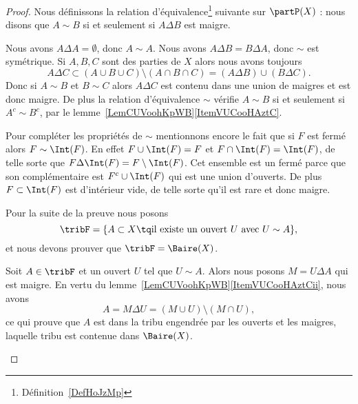 \begin{proof}
	Nous définissons la relation d'équivalence\footnote{Définition~\ref{DefHoJzMp}} suivante sur \( \partP(X)\) : nous disons que \( A\sim B\) si et seulement si \( A\Delta B\) est maigre.
	\begin{subproof}
		\spitem[Réflexive]
		Nous avons \( A\Delta A=\emptyset\), donc \( A\sim A\).
		\spitem[symétrique] Nous avons \( A\Delta B=B\Delta A\), donc \( \sim\) est symétrique.
		\spitem[transitive] Si \( A,B,C\) sont des parties de \( X\) alors nous avons toujours
		\begin{equation}
			A\Delta C\subset (A\cup B\cup C)\setminus(A\cap B\cap C)=(A\Delta B)\cup (B\Delta C).
		\end{equation}
		Donc si \( A\sim B\) et \( B\sim C\) alors \( A\Delta C\) est contenu dans une union de maigres et est donc maigre.
		De plus la relation d'équivalence \( \sim\) vérifie \( A\sim B\) si et seulement si \( A^c\sim B^c\), par le lemme~\ref{LemCUVoohKpWB}\ref{ItemVUCooHAztC}.

		Pour compléter les propriétés de \( \sim\) mentionnons encore le fait que si \( F\) est fermé alors \( F\sim\Int(F)\). En effet \( F\cup\Int(F)=F\) et \( F\cap\Int(F)=\Int(F)\), de telle sorte que \( F\Delta\Int(F)=F\setminus\Int(F)\). Cet ensemble est un fermé parce que son complémentaire est \( F^c\cup\Int(F)\) qui est une union d'ouverts. De plus \( F\subset\Int(F)\) est d'intérieur vide, de telle sorte qu'il est rare et donc maigre.
	\end{subproof}

	Pour la suite de la preuve nous posons
	\begin{equation}
		\tribF=\{ A\subset X\tq\text{il existe un ouvert } U\text{ avec } U\sim A \},
	\end{equation}
	et nous devons prouver que \( \tribF=\Baire(X)\).

	\begin{subproof}
		\spitem[\( \tribF\subset\Baire(X)\)]

		Soit \( A\in\tribF\) et un ouvert \( U\) tel que \( U\sim A\). Alors nous posons \( M=U\Delta A\) qui est maigre. En vertu du lemme~\ref{LemCUVoohKpWB}\ref{ItemVUCooHAztCii}, nous avons
		\begin{equation}
			A=M\Delta U=(M\cup U)\setminus(M\cap U),
		\end{equation}
		ce qui prouve que \( A\) est dans la tribu engendrée par les ouverts et les maigres, laquelle tribu est contenue dans \( \Baire(X)\).
		\spitem[\( \Baire(X)\subset\tribF\)]


\end{subproof}
\end{proof}

